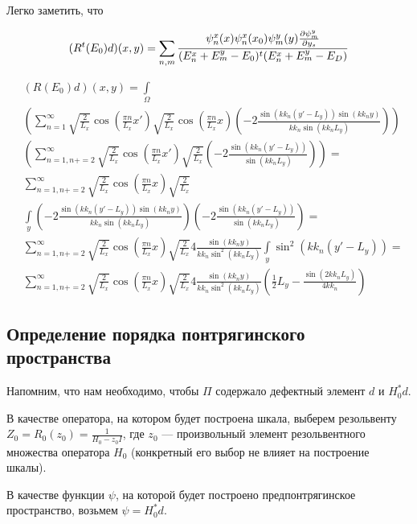 Легко заметить, что 

\[
(R^t(E_0) d)(x, y)
= \sum\limits_{n, m} \frac{\psi_n^x(x) \psi_n^x(x_0) \psi_m^y(y) \pdv{\psi_m^y}{y_s} (y_0)}{(E^x_n + E^y_m - E_0)^t(E^x_n + E^y_m - E_D)}
\]

\begin{align*}
& (R(E_0) d)(x, y) = \int\limits_\Omega \\
& \left(
\sum\limits_{n = 1}^\infty
\sqrt{\frac{2}{L_x}} \cos(\frac{\pi n}{L_x} x') \sqrt{\frac{2}{L_x}} \cos(\frac{\pi n}{L_x} x)
\left(-2\frac{\sin(kk_n(y' - L_y)) \sin(kk_n y)}{kk_n \sin(kk_n L_y)}\right)
\right) \\
& \left(
\sum\limits_{n = 1, n += 2}^\infty
\sqrt{\frac{2}{L_x}} \cos(\frac{\pi n}{L_x} x') \sqrt{\frac{2}{L_x}}
\left(-2\frac{\sin(kk_n(y' - L_y))}{\sin(kk_n L_y)}\right)
\right) = \\
& \sum\limits_{n = 1, n += 2}^\infty
\sqrt{\frac{2}{L_x}} \cos(\frac{\pi n}{L_x} x) \sqrt{\frac{2}{L_x}}\\
& \int\limits_y  \left(-2\frac{\sin(kk_n(y' - L_y)) \sin(kk_n y)}{kk_n \sin(kk_n L_y)}\right)
\left(-2\frac{\sin(kk_n(y' - L_y))}{\sin(kk_n L_y)}\right) = \\
& \sum\limits_{n = 1, n += 2}^\infty
\sqrt{\frac{2}{L_x}} \cos(\frac{\pi n}{L_x} x) \sqrt{\frac{2}{L_x}} 4 \frac{\sin(kk_n y) }{kk_n \sin^2(kk_n L_y)}\int\limits_y  \sin^2(kk_n(y' - L_y)) = \\
& \sum\limits_{n = 1, n += 2}^\infty
\sqrt{\frac{2}{L_x}} \cos(\frac{\pi n}{L_x} x) \sqrt{\frac{2}{L_x}} 4 \frac{\sin(kk_n y) }{kk_n \sin^2(kk_n L_y)}
\left( \frac{1}{2} L_y - \frac{\sin(2 kk_n L_y)}{4 kk_n} \right)
\end{align*}

\subsection{Определение порядка понтрягинского пространства}

Напомним, что нам необходимо, чтобы $\Pi$ содержало дефектный элемент $d$ и $H_0^* d$.

В качестве оператора, на котором будет построена шкала, выберем резольвенту $Z_0 = R_0(z_0) = \frac{1}{H_0 - z_0 I}$, где $z_0$ — произвольный элемент резольвентного множества оператора $H_0$ (конкретный его выбор не влияет на построение шкалы).

В качестве функции $\psi$, на которой будет построено предпонтрягинское пространство, возьмем $\psi = H_0^* d$.

